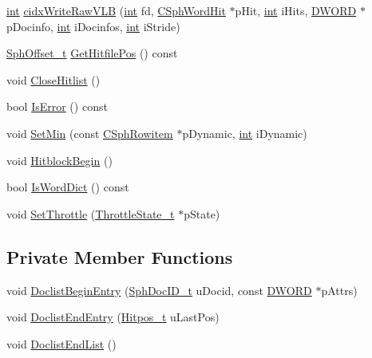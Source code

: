 \begin{DoxyCompactItemize}
\item 
\hyperlink{sphinxexpr_8cpp_a4a26e8f9cb8b736e0c4cbf4d16de985e}{int} \hyperlink{classCSphHitBuilder_a229e1fc6c368a9d8595a2408be40e70c}{cidx\-Write\-Raw\-V\-L\-B} (\hyperlink{sphinxexpr_8cpp_a4a26e8f9cb8b736e0c4cbf4d16de985e}{int} fd, \hyperlink{structCSphWordHit}{C\-Sph\-Word\-Hit} $\ast$p\-Hit, \hyperlink{sphinxexpr_8cpp_a4a26e8f9cb8b736e0c4cbf4d16de985e}{int} i\-Hits, \hyperlink{sphinxstd_8h_a798af1e30bc65f319c1a246cecf59e39}{D\-W\-O\-R\-D} $\ast$p\-Docinfo, \hyperlink{sphinxexpr_8cpp_a4a26e8f9cb8b736e0c4cbf4d16de985e}{int} i\-Docinfos, \hyperlink{sphinxexpr_8cpp_a4a26e8f9cb8b736e0c4cbf4d16de985e}{int} i\-Stride)
\item 
\hyperlink{sphinx_8h_a0fb3b64afebef33c61367714754eaa90}{Sph\-Offset\-\_\-t} \hyperlink{classCSphHitBuilder_a1f288c61937a17b7ba825caf239e5ff8}{Get\-Hitfile\-Pos} () const 
\item 
void \hyperlink{classCSphHitBuilder_a7007b74099a377815a8b0b9fa423b39d}{Close\-Hitlist} ()
\item 
bool \hyperlink{classCSphHitBuilder_ab35ebef10c9f86025b58aade48ee2024}{Is\-Error} () const 
\item 
void \hyperlink{classCSphHitBuilder_a91144ca0d5d43fcf9a67c4a047d2cf79}{Set\-Min} (const \hyperlink{sphinx_8h_a6a2df0f05f3397df8b6e230fda6f852f}{C\-Sph\-Rowitem} $\ast$p\-Dynamic, \hyperlink{sphinxexpr_8cpp_a4a26e8f9cb8b736e0c4cbf4d16de985e}{int} i\-Dynamic)
\item 
void \hyperlink{classCSphHitBuilder_a356d74d80ac4c9f01a9dac4bece9b6ac}{Hitblock\-Begin} ()
\item 
bool \hyperlink{classCSphHitBuilder_a5d7a0ec029e5dd66d5025fd7cdb5190c}{Is\-Word\-Dict} () const 
\item 
void \hyperlink{classCSphHitBuilder_a27220f2e63577c61f9dfc0682edbce19}{Set\-Throttle} (\hyperlink{structThrottleState__t}{Throttle\-State\-\_\-t} $\ast$p\-State)
\end{DoxyCompactItemize}
\subsection*{Private Member Functions}
\begin{DoxyCompactItemize}
\item 
void \hyperlink{classCSphHitBuilder_ad72602c48cbcfc7c2ba8ca4fe60f5a9a}{Doclist\-Begin\-Entry} (\hyperlink{sphinx_8h_a3176771631c12a9e4897272003e6b447}{Sph\-Doc\-I\-D\-\_\-t} u\-Docid, const \hyperlink{sphinxstd_8h_a798af1e30bc65f319c1a246cecf59e39}{D\-W\-O\-R\-D} $\ast$p\-Attrs)
\item 
void \hyperlink{classCSphHitBuilder_a5cac1ea4e077f7fdc105abb36526fc43}{Doclist\-End\-Entry} (\hyperlink{sphinx_8h_af1385e83d53e0648b15eae6d8f101847}{Hitpos\-\_\-t} u\-Last\-Pos)
\item 
void \hyperlink{classCSphHitBuilder_ac6665b2c0ab70048e12516d0662f1194}{Doclist\-End\-List} ()
\end{DoxyCompactItemize}
